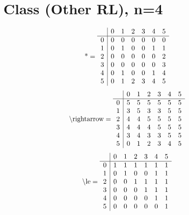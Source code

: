 \documentclass[11pt]{article}
\begin{document}
\section{Class (Other RL), n=4}
\[\text{*} = 
\begin{array}{r | r r r r r r}
 & 0 & 1 & 2 & 3 & 4 & 5 \\ \hline
0 & 0 & 0 & 0 & 0 & 0 & 0 \\
1 & 0 & 1 & 0 & 0 & 1 & 1 \\
2 & 0 & 0 & 0 & 0 & 0 & 2 \\
3 & 0 & 0 & 0 & 0 & 0 & 3 \\
4 & 0 & 1 & 0 & 0 & 1 & 4 \\
5 & 0 & 1 & 2 & 3 & 4 & 5 \\
\end{array}
\]
\[\text{\textbackslash rightarrow} = 
\begin{array}{r | r r r r r r}
 & 0 & 1 & 2 & 3 & 4 & 5 \\ \hline
0 & 5 & 5 & 5 & 5 & 5 & 5 \\
1 & 3 & 5 & 3 & 3 & 5 & 5 \\
2 & 4 & 4 & 5 & 5 & 5 & 5 \\
3 & 4 & 4 & 4 & 5 & 5 & 5 \\
4 & 3 & 4 & 3 & 3 & 5 & 5 \\
5 & 0 & 1 & 2 & 3 & 4 & 5 \\
\end{array}
\]
\[\text{\textbackslash le} = 
\begin{array}{r | r r r r r r}
 & 0 & 1 & 2 & 3 & 4 & 5 \\ \hline
0 & 1 & 1 & 1 & 1 & 1 & 1 \\
1 & 0 & 1 & 0 & 0 & 1 & 1 \\
2 & 0 & 0 & 1 & 1 & 1 & 1 \\
3 & 0 & 0 & 0 & 1 & 1 & 1 \\
4 & 0 & 0 & 0 & 0 & 1 & 1 \\
5 & 0 & 0 & 0 & 0 & 0 & 1 \\
\end{array}
\]
\end{document}
